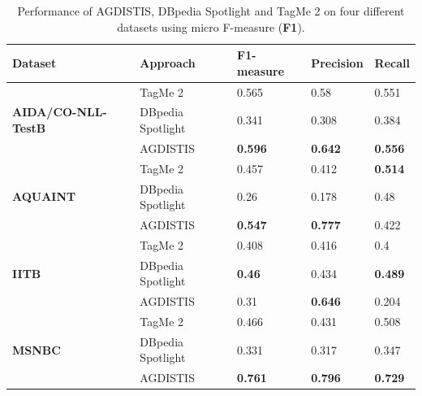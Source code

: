 \begin{table}[htb!]
    \centering

\begin{tabular}[tb]{@{}lllll@{}}
\toprule
Dataset                            & Approach          & \textbf{F1-measure}             & \textbf{Precision} & \textbf{Recall} \\ \midrule
\multirow{3}{*}{\begin{minipage}{0.8in}\textbf{AIDA/CO-NLL-TestB}\end{minipage}} & TagMe 2           & 0.565          & 0.58      & 0.551  \\
                                   & DBpedia Spotlight & 0.341          & 0.308     & 0.384  \\
                                   & AGDISTIS          & \textbf{0.596} & \textbf{0.642}     & \textbf{0.556}  \\ \midrule
\multirow{3}{*}{\textbf{AQUAINT}}  & TagMe 2           & 0.457          & 0.412     & \textbf{0.514}  \\
                                   & DBpedia Spotlight & 0.26           & 0.178     & 0.48   \\
                                   & AGDISTIS          & \textbf{0.547} & \textbf{0.777}     & 0.422  \\\midrule
\multirow{3}{*}{\textbf{IITB}}     & TagMe 2           & 0.408          & 0.416     & 0.4    \\
                                   & DBpedia Spotlight & \textbf{0.46}  & 0.434     & \textbf{0.489}  \\
                                   & AGDISTIS          & 0.31           & \textbf{0.646}     & 0.204  \\\midrule
\multirow{3}{*}{\textbf{MSNBC}}    & TagMe 2           & 0.466          & 0.431     & 0.508  \\
                                   & DBpedia Spotlight & 0.331          & 0.317     & 0.347  \\
                                   & AGDISTIS          & \textbf{0.761} & \textbf{0.796}     & \textbf{0.729}  \\ \bottomrule
\end{tabular}
\caption{Performance of AGDISTIS, DBpedia Spotlight and TagMe 2 on four different datasets using micro F-measure (\textbf{F1}).}
\label{tab:evalnew}
\end{table}



